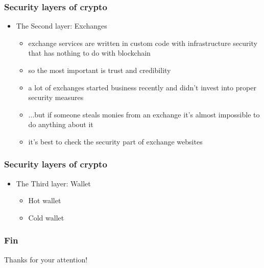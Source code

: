 \documentclass{beamer}
\begin{document}
\begin{frame}
    \frametitle{Security layers of crypto}
    \begin{itemize}
        \item<1-> The Second layer: Exchanges
        \begin{itemize}
            \item<2-> exchange services are written in custom code with infrastructure security that has nothing to do with blockchain
            \item<3-> so the most important is trust and credibility
            \item<4-> a lot of exchanges started business recently and didn't invest into proper security measures
            \item<5-> ...but if someone steals monies from an exchange it's almost impossible to do anything about it
            \item<6-> it's best to check the security part of exchange websites
        \end{itemize}   
    \end{itemize}
\end{frame}

\begin{frame}
    \frametitle{Security layers of crypto}
    \begin{itemize}
        \item<1-> The Third layer: Wallet
        \begin{itemize}
            \item<2-> Hot wallet
            \item<3-> Cold wallet
        \end{itemize}   
    \end{itemize}
\end{frame}

\begin{frame}
    \frametitle{Fin}
    \begin{center}
    Thanks for your attention!
    \end{center}
\end{frame}
\end{document}
